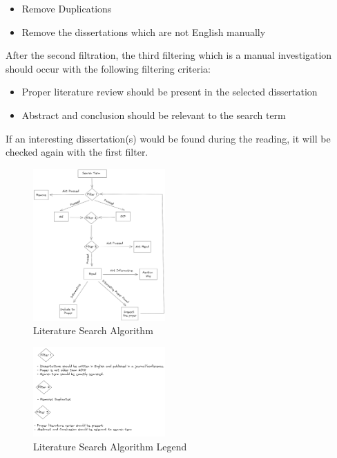 \documentclass[9pt,conference]{IEEEtran}
\begin{document}
    \begin{itemize}
        \item Remove Duplications
        \item Remove the dissertations which are not English manually
    \end{itemize}  
    
    After the second filtration, the third filtering which is a manual investigation should occur with the following filtering criteria:
    \begin{itemize}
        \item Proper literature review should be present in the selected dissertation
        \item Abstract and conclusion should be relevant to the search term
    \end{itemize}
    
    If an interesting dissertation(s) would be found during the reading, it will be checked again with the first filter.
    \begin{figure}
        \centering
        \includegraphics[width =0.45\textwidth]{LRMethod.png}
        \caption{Literature Search Algorithm}
        \label{fig:literaturesearchalgorithm}
    \end{figure} 
    \begin{figure}
        \centering
        \includegraphics[width =0.45\textwidth]{LRMethodLegacy.png}
        \caption{Literature Search Algorithm Legend}
        \label{fig:literaturesearchalgorithmlegend}
    \end{figure}
\end{document}
